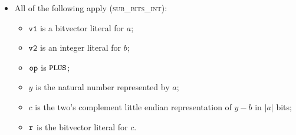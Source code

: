\documentclass{book}
\newcommand\vvone[0]{\texttt{v1}}
\newcommand\vvtwo[0]{\texttt{v2}}
\begin{document}
\begin{itemize}
  \item All of the following apply (\textsc{sub\_bits\_int}):
  \begin{itemize}
    \item $\vvone$ is a bitvector literal for $a$;
    \item $\vvtwo$ is an integer literal for $b$;
    \item $\texttt{op}$ is $\texttt{PLUS}$;
    \item $y$ is the natural number represented by $a$;
    \item $c$ is the two's complement little endian representation of $y-b$ in $|a|$ bits;
    \item $\texttt{r}$ is the bitvector literal for $c$.
  \end{itemize}
\end{itemize}
\end{document}
